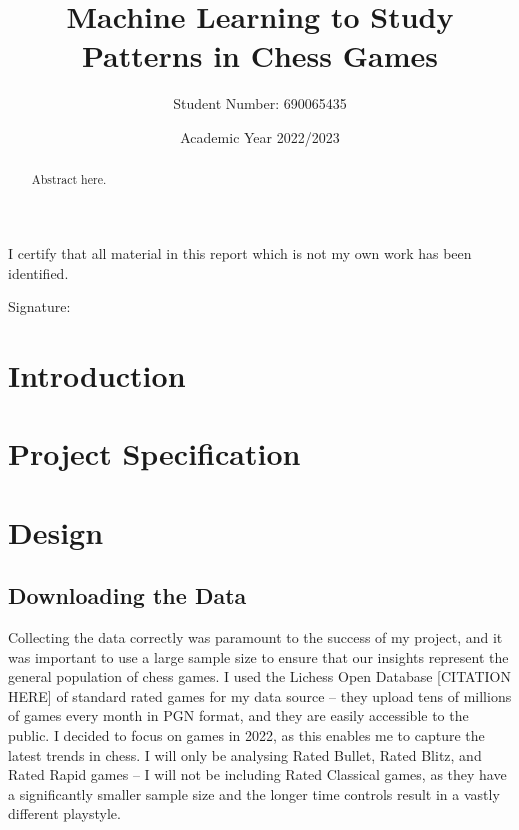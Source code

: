 \documentclass[a4paper, 11pt]{article}
\begin{document}
\title{Machine Learning to Study Patterns in Chess Games}
\author{Student Number: 690065435}
\date{Academic Year 2022/2023}

\maketitle

\begin{abstract}
{Abstract here}.

\begin{center}
\end{center}
\end{abstract}

\vspace*{\fill}
\begin{center}

\vspace{1em}
I certify that all material in this report which is not my own work has been identified.
\end{center}
\vspace{1em}

Signature: \hrulefill

\newpage

\section{Introduction}

\section{Project Specification}

\section{Design}

\subsection{Downloading the Data}
Collecting the data correctly was paramount to the success of my project, and it was important to use a large sample size to ensure that our insights represent the general population of chess games. I used the Lichess Open Database [CITATION HERE] of standard rated games for my data source -- they upload tens of millions of games every month in PGN format, and they are easily accessible to the public. I decided to focus on games in 2022, as this enables me to capture the latest trends in chess. I will only be analysing Rated Bullet, Rated Blitz, and Rated Rapid games -- I will not be including Rated Classical games, as they have a significantly smaller sample size and the longer time controls result in a vastly different playstyle.
\end{document}
